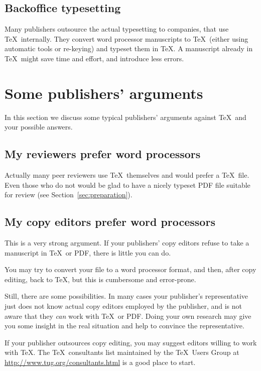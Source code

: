 \documentclass{article}
\begin{document}
\subsection{Backoffice typesetting}
\label{sec:backoffice}

Many publishers outsource the actual typesetting to companies, that
use \TeX\ internally.  They convert word processor manuscripts to
\TeX\ (either using automatic tools or re-keying) and typeset them in
\TeX.  A manuscript already in \TeX\ might save time and effort, and
introduce less errors.

\section{Some publishers' arguments}
\label{sec:arguments}

In this section we discuss some typical publishers' arguments against
\TeX\ and your possible answers.


\subsection{My reviewers prefer word processors}
\label{sec:reviewers}

Actually many peer reviewers use \TeX\ themselves and would prefer a
\TeX\ file.  Even those who do not would be glad to have a nicely
typeset PDF file suitable for review (see
Section~\ref{sec:preparation}).  

\subsection{My copy editors prefer word processors}
\label{sec:copy-editors}

This is a very strong argument.  If your publishers' copy editors
refuse to take a manuscript in \TeX\ or PDF, there is little you can
do.  

You may try to convert your file to a word processor format, and then,
after copy editing, back to \TeX, but this is cumbersome and
error-prone.

Still, there are some possibilities.  In many cases your publisher's
representative just does not know actual copy editors employed by the
publisher, and is not aware that they \emph{can} work with \TeX\ or
PDF.  Doing your own research may give you some insight in the real
situation and help to convince the representative.

If your publisher outsources copy editing, you may suggest editors
willing to work with \TeX.  The \TeX\ consultants list maintained by
the \TeX\ Users Group at \url{http://www.tug.org/consultants.html} is
a good place to start.
\end{document}
